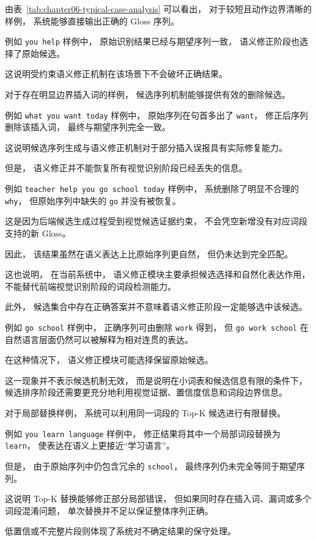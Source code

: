 由表~\ref{tab:chapter06-typical-case-analysis} 可以看出，
对于较短且动作边界清晰的样例，
系统能够直接输出正确的 Gloss 序列。

例如 \texttt{you help} 样例中，
原始识别结果已经与期望序列一致，
语义修正阶段也选择了原始候选。

这说明受约束语义修正机制在该场景下不会破坏正确结果。

对于存在明显边界插入词的样例，
候选序列机制能够提供有效的删除候选。

例如 \texttt{what you want today} 样例中，
原始序列在句首多出了 \texttt{want}，
修正后序列删除该插入词，
最终与期望序列完全一致。

这说明候选序列生成与语义修正机制对于部分插入误报具有实际修复能力。

但是，
语义修正并不能恢复所有视觉识别阶段已经丢失的信息。

例如 \texttt{teacher help you go school today} 样例中，
系统删除了明显不合理的 \texttt{why}，
但原始序列中缺失的 \texttt{go} 并没有被恢复。

这是因为后端候选生成过程受到视觉候选证据约束，
不会凭空新增没有对应词段支持的新 Gloss。

因此，
该结果虽然在语义表达上比原始序列更自然，
但仍未达到完全匹配。

这也说明，
在当前系统中，
语义修正模块主要承担候选选择和自然化表达作用，
不能替代前端视觉识别阶段的词段检测能力。

此外，
候选集合中存在正确答案并不意味着语义修正阶段一定能够选中该候选。

例如 \texttt{go school} 样例中，
正确序列可由删除 \texttt{work} 得到，
但 \texttt{go work school} 在自然语言层面仍然可以被解释为相对连贯的表达。

在这种情况下，
语义修正模块可能选择保留原始候选。

这一现象并不表示候选机制无效，
而是说明在小词表和候选信息有限的条件下，
候选排序阶段还需要更充分地利用视觉证据、置信度信息和词段边界信息。

对于局部替换样例，
系统可以利用同一词段的 Top-K 候选进行有限替换。

例如 \texttt{you learn language} 样例中，
修正结果将其中一个局部词段替换为 \texttt{learn}，
使表达在语义上更接近“学习语言”。

但是，
由于原始序列中仍包含冗余的 \texttt{school}，
最终序列仍未完全等同于期望序列。

这说明 Top-K 替换能够修正部分局部错误，
但如果同时存在插入词、漏词或多个词段混淆问题，
单次替换并不足以保证整体序列正确。

低置信或不完整片段则体现了系统对不确定结果的保守处理。

